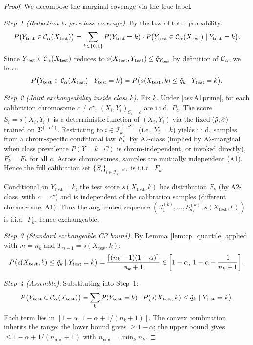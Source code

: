 \begin{proof}
We decompose the marginal coverage via the true label.

\textit{Step~1 (Reduction to per-class coverage).}
By the law of total probability:
\[
P\bigl(Y_{\mathrm{test}} \in \mathcal{C}_\alpha(X_{\mathrm{test}})\bigr)
= \sum_{k \in \{0,1\}} P(Y_{\mathrm{test}} = k) \cdot P\bigl(Y_{\mathrm{test}} \in \mathcal{C}_\alpha(X_{\mathrm{test}}) \mid Y_{\mathrm{test}} = k\bigr).
\]
Since $Y_{\mathrm{test}} \in \mathcal{C}_\alpha(X_{\mathrm{test}})$ reduces to $s(X_{\mathrm{test}}, Y_{\mathrm{test}}) \leq \hat{q}_{Y_{\mathrm{test}}}$ by definition of $\mathcal{C}_\alpha$, we have
\[
P\bigl(Y_{\mathrm{test}} \in \mathcal{C}_\alpha(X_{\mathrm{test}}) \mid Y_{\mathrm{test}} = k\bigr)
= P\bigl(s(X_{\mathrm{test}}, k) \leq \hat{q}_k \mid Y_{\mathrm{test}} = k\bigr).
\]

\textit{Step~2 (Joint exchangeability inside class $k$).}
Fix $k$. Under \ref{ass:A1prime}, for each calibration chromosome $c \neq c^\star$, $(X_i, Y_i)_{C_i = c}$ are i.i.d.\ $P_c$. The score $S_i = s(X_i, Y_i)$ is a deterministic function of $(X_i, Y_i)$ via the fixed $(\hat{p}, \hat{\sigma})$ trained on $\mathcal{D}^{(-c^\star)}$. Restricting to $i \in \mathcal{I}_k^{(-c^\star)}$ (i.e., $Y_i = k$) yields i.i.d.\ samples from a chrom-specific conditional law $F_k^c$. By A2-class (implied by A2-marginal when class prevalence $P(Y = k \mid C)$ is chrom-independent, or invoked directly), $F_k^c = F_k$ for all $c$. Across chromosomes, samples are mutually independent (A1). Hence the full calibration set $\{S_i\}_{i \in \mathcal{I}_k^{(-c^\star)}}$ is i.i.d.\ $F_k$.

Conditional on $Y_{\mathrm{test}} = k$, the test score $s(X_{\mathrm{test}}, k)$ has distribution $F_k$ (by A2-class, with $c = c^\star$) and is independent of the calibration samples (different chromosome, A1). Thus the augmented sequence $(S_1^{(k)}, \ldots, S_{n_k}^{(k)}, s(X_{\mathrm{test}}, k))$ is i.i.d.\ $F_k$, hence exchangeable.

\textit{Step~3 (Standard exchangeable CP bound).}
By Lemma~\ref{lem:cp_quantile} applied with $m = n_k$ and $T_{m+1} = s(X_{\mathrm{test}}, k)$:
\[
P\bigl(s(X_{\mathrm{test}}, k) \leq \hat{q}_k \mid Y_{\mathrm{test}} = k\bigr)
= \frac{\lceil (n_k+1)(1-\alpha)\rceil}{n_k+1}
\in \left[1-\alpha,\; 1-\alpha + \frac{1}{n_k+1}\right].
\]

\textit{Step~4 (Assemble).}
Substituting into Step~1:
\[
P\bigl(Y_{\mathrm{test}} \in \mathcal{C}_\alpha(X_{\mathrm{test}})\bigr)
= \sum_k P(Y_{\mathrm{test}} = k) \cdot P\bigl(s(X_{\mathrm{test}}, k) \leq \hat{q}_k \mid Y_{\mathrm{test}} = k\bigr).
\]
Each term lies in $[1-\alpha,\, 1-\alpha + 1/(n_k+1)]$. The convex combination inherits the range: the lower bound gives $\geq 1-\alpha$; the upper bound gives $\leq 1-\alpha + 1/(n_{\min}+1)$ with $n_{\min} = \min_k n_k$.
\end{proof}


